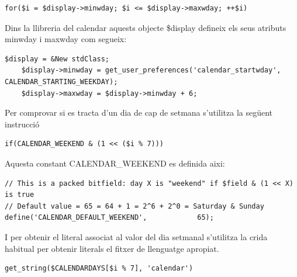 \documentclass[a4paper]{report}  %
\begin{document}
\begin{lstlisting}[style=PHP,caption=Iteració per recorrer i processar els dies de la setmana en l'ordre definit per la configuració.]
	for($i = $display->minwday; $i <= $display->maxwday; ++$i)
\end{lstlisting}
Dins la llibreria del calendar aquests objecte \$display defineix els seus atributs minwday i maxwday com segueix:
\begin{lstlisting}[style=PHP,caption=calendar\textbackslash lib.php Definició del objecte display.]
    $display = &New stdClass;
    $display->minwday = get_user_preferences('calendar_startwday', CALENDAR_STARTING_WEEKDAY);
    $display->maxwday = $display->minwday + 6;
\end{lstlisting}
Per comprovar si es tracta d'un dia de cap de setmana s'utilitza la següent instrucció
\begin{lstlisting}[style=PHP,caption=Iteració per recorrer i processar els dies de la setmana en l'ordre definit per la configuració.]
	if(CALENDAR_WEEKEND & (1 << ($i % 7))) 
\end{lstlisting}
Aquesta constant CALENDAR\_WEEKEND es definida aixi:
\begin{lstlisting}[style=PHP,caption=calendar\textbackslash lib.php Definició de la constant CALENDAR\_WEEKEND.]
// This is a packed bitfield: day X is "weekend" if $field & (1 << X) is true
// Default value = 65 = 64 + 1 = 2^6 + 2^0 = Saturday & Sunday
define('CALENDAR_DEFAULT_WEEKEND',            65);
\end{lstlisting}
I per obtenir el literal associat al valor del dia setmanal s'utilitza la crida habitual per obtenir literals el fitxer de llenguatge apropiat. 
\begin{lstlisting}[style=PHP,caption=Crida per obtenir els literals per als noms dels dies de la setmana]
get_string($CALENDARDAYS[$i % 7], 'calendar')
\end{lstlisting}
\end{document}
